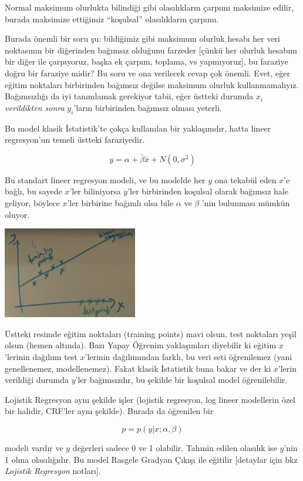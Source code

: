 \documentclass[12pt,fleqn]{article}\usepackage{../../common}
\begin{document}
Normal maksimum olurlukta bilindiği gibi olasılıkların çarpımı maksimize
edilir, burada maksimize ettiğimiz ``koşulsal'' olasılıkların çarpımı. 

Burada önemli bir soru şu: bildiğimiz gibi maksimum olurluk hesabı her veri
noktasının bir diğerinden bağımsız olduğunu farzeder [çünkü her olurluk hesabını
  bir diğer ile çarpıyoruz, başka ek çarpım, toplama, vs yapmıyoruz], bu
faraziye doğru bir faraziye midir? Bu soru ve ona verilecek cevap çok
önemli. Evet, eğer eğitim noktaları birbirinden bağımsız değilse maksimum
olurluk kullanmamalıyız. Bağımsızlığı da iyi tanımlamak gerekiyor tabii, eğer
üstteki durumda $x_i$ {\em verildikten sonra} $y_i$'ların birbirinden bağımsız
olması yeterli.

Bu model klasik İstatistik'te çokça kullanılan bir yaklaşımdır, hatta lineer
regresyon'un temeli üstteki faraziyedir.

$$
y = \alpha + \bar{\beta}\bar{x} + N(0,\sigma^2)
$$

Bu standart lineer regresyon modeli, ve bu modelde her $y$ ona tekabül eden
$x$'e bağlı, bu sayede $x$'ler biliniyorsa $y$'ler birbirinden koşulsal olarak
bağımsız hale geliyor, böylece $x$'ler birbirine bağımlı olsa bile $\alpha$ ve
$\beta$ 'nin bulunması mümkün oluyor.

\includegraphics[height=4cm]{crf_1.png}

Üstteki resimde eğitim noktaları (training points) mavi olsun, test noktaları
yeşil olsun (hemen altında). Bazı Yapay Öğrenim yaklaşımları diyebilir ki eğitim
$x$'lerinin dağılımı test $x$'lerinin dağılımından farklı, bu veri seti
öğrenilemez (yani genellenemez, modellenemez). Fakat klasik İstatistik buna
bakar ve der ki $x$'lerin verildiği durumda $y$'ler bağımsızdır, bu şekilde bir
koşulsal model öğrenilebilir.

Lojistik Regresyon aynı şekilde işler (lojistik regresyon, log lineer
modellerin özel bir halidir, CRF'ler aynı şekilde). Burada
da öğrenilen bir

$$
p = p(y | x;\alpha, \beta)
$$

modeli vardır ve $y$ değerleri sadece 0 ve 1 olabilir. Tahmin edilen
olasılık ise $y$'nin 1 olma olasılığıdır. Bu model Rasgele Gradyan Çıkışı
ile eğitilir [detaylar için bkz {\em Lojistik Regresyon} notları].
\end{document}
